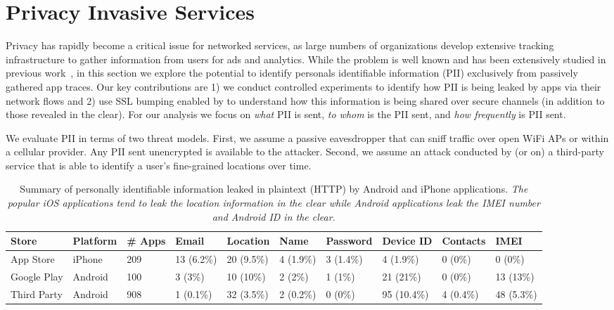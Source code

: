 \section{Privacy Invasive Services}
\label{sec:characterize-app}
Privacy has rapidly become a critical issue for networked services, as large numbers of organizations develop 
extensive tracking infrastructure to gather information from users for ads and analytics. While the problem 
is well known and has been extensively studied in previous work~\cite{roesner:webtrackers,leontiadis:mobileads,vallina-rod:ads}, in this section we explore the potential to 
identify personals identifiable information (PII) exclusively from passively gathered app traces. Our key 
contributions are 1) we conduct controlled experiments to identify how PII is being leaked by apps via 
their network flows and 2) use SSL bumping enabled by \platname{} to understand how this information is being shared over 
secure channels (in addition to those revealed in the clear). 
For our analysis we focus on {\it what} PII is sent,  {\it to whom} is the PII sent, and {\it how frequently} is PII sent.

We evaluate PII in terms of two threat models. First, we assume a passive eavesdropper that can sniff 
traffic over open WiFi APs or within a cellular provider. Any PII sent unencrypted is available to the attacker. 
Second, we assume an attack conducted by (or on) a third-party service that is able to identify a user's fine-grained locations 
over time. 

\begin{table}[t]    
    \centering
    \begin{small}
    \begin{tabular}{|l|l|l|l|l|l|l|l|l|l|}
       \hline
       {\bf Store}&{\bf Platform}&{\bf \# Apps}&{\bf Email}& {\bf Location}& {\bf Name} &{\bf Password}& {\bf Device ID}& {\bf Contacts}& {\bf IMEI}\\
       \hline
       App Store&iPhone&209&13 (6.2\%) &20 (9.5\%)&4 (1.9\%)&3 (1.4\%)&4 (1.9\%)&0 (0\%)&0 (0\%)\\
       \hline
       Google Play&Android&100&3 (3\%)&10 (10\%)&2 (2\%)&1 (1\%)&21 (21\%)&0 (0\%)&13 (13\%)\\
       \hline
       Third Party&Android&908&1 (0.1\%)&32 (3.5\%)&2 (0.2\%)&0 (0\%)&95 (10.4\%)&4 (0.4\%)&48 (5.3\%)\\
       \hline
    \end{tabular}
    \end{small}
    \caption{Summary of personally identifiable information leaked in plaintext (HTTP) by Android and iPhone applications. \emph{The popular iOS applications tend to leak the location information in the clear while Android applications leak the IMEI number and Android ID in the clear.}}
    \label{tab:pii}
\end{table}


